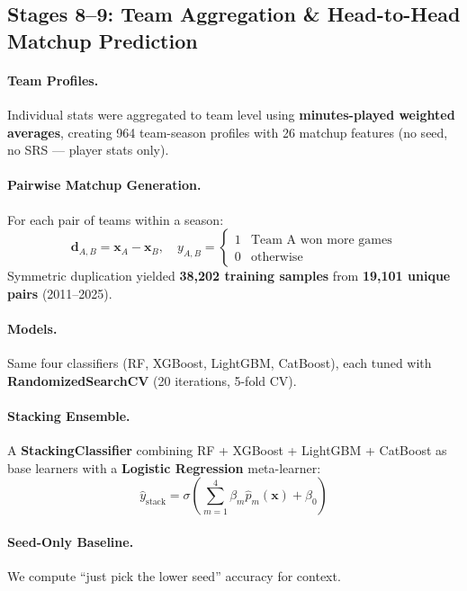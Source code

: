 \documentclass[12pt, a4paper]{article}
\begin{document}
\subsection{Stages 8--9: Team Aggregation \& Head-to-Head Matchup Prediction}

\paragraph{Team Profiles.} Individual stats were aggregated to team level using \textbf{minutes-played weighted averages}, creating 964 team-season profiles with 26 matchup features (no seed, no SRS --- player stats only).

\paragraph{Pairwise Matchup Generation.} For each pair of teams within a season:
\begin{equation}
    \mathbf{d}_{A,B} = \mathbf{x}_A - \mathbf{x}_B, \quad
    y_{A,B} = \begin{cases} 1 & \text{Team A won more games} \\ 0 & \text{otherwise} \end{cases}
\end{equation}
Symmetric duplication yielded \textbf{38,202 training samples} from \textbf{19,101 unique pairs} (2011--2025).

\paragraph{Models.} Same four classifiers (RF, XGBoost, LightGBM, CatBoost), each tuned with \textbf{RandomizedSearchCV} (20 iterations, 5-fold CV).

\paragraph{Stacking Ensemble.} A \textbf{StackingClassifier} combining RF + XGBoost + LightGBM + CatBoost as base learners with a \textbf{Logistic Regression} meta-learner:
\begin{equation}
    \hat{y}_{\text{stack}} = \sigma\left(\sum_{m=1}^{4} \beta_m \hat{p}_m(\mathbf{x}) + \beta_0\right)
\end{equation}

\paragraph{Seed-Only Baseline.} We compute ``just pick the lower seed'' accuracy for context.
\end{document}
